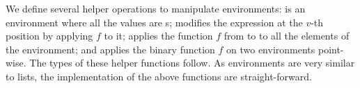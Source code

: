 We define several helper operations to manipulate environments:  is 
an environment where all the values are s;  modifies the 
expression at the $v$-th position by applying $f$ to it;  applies the function
$f$ from  to  to all the elements of the environment; and 
applies the binary function $f$ on two environments point-wise.  The types of these
helper functions follow.  As environments are very similar to lists, the implementation
of the above functions are straight-forward.
\begin{code}%
%
\>[2]\AgdaSpace{}%
\AgdaSymbol{:}\AgdaSpace{}%
\AgdaSpace{}%
\AgdaSpace{}%
\<%
\\
%
\>[2]\AgdaSpace{}%
\AgdaSymbol{:}\AgdaSpace{}%
\AgdaSpace{}%
\AgdaSpace{}%
\AgdaSpace{}%
\AgdaSpace{}%
\AgdaSymbol{(}\AgdaSpace{}%
\AgdaSymbol{:}\AgdaSpace{}%
\AgdaSpace{}%
\AgdaSpace{}%
\AgdaSpace{}%
\AgdaSymbol{)}\AgdaSpace{}%
\AgdaSpace{}%
\AgdaSymbol{(}\AgdaSpace{}%
\AgdaSymbol{:}\AgdaSpace{}%
\AgdaSpace{}%
\AgdaSpace{}%
\AgdaSymbol{(}\AgdaSpace{}%
\AgdaSymbol{)}\AgdaSpace{}%
\AgdaSpace{}%
\AgdaSpace{}%
\AgdaSpace{}%
\AgdaSymbol{(}\AgdaSpace{}%
\AgdaSymbol{))}\AgdaSpace{}%
\AgdaSpace{}%
\AgdaSpace{}%
\AgdaSpace{}%
\<%
\\
%
\>[2]\AgdaSpace{}%
\AgdaSymbol{:}\AgdaSpace{}%
\AgdaSpace{}%
\AgdaSymbol{\{}\AgdaSpace{}%
\AgdaSpace{}%
\AgdaSymbol{\}}\AgdaSpace{}%
\AgdaSpace{}%
\AgdaSymbol{(}\AgdaSpace{}%
\AgdaSymbol{:}\AgdaSpace{}%
\AgdaSpace{}%
\AgdaSymbol{\{}\AgdaSymbol{\}}\AgdaSpace{}%
\AgdaSpace{}%
\AgdaSpace{}%
\AgdaSpace{}%
\AgdaSymbol{(}\AgdaSpace{}%
\AgdaSymbol{)}\AgdaSpace{}%
\AgdaSpace{}%
\AgdaSpace{}%
\AgdaSpace{}%
\AgdaSymbol{(}\AgdaSpace{}%

\end{code}
